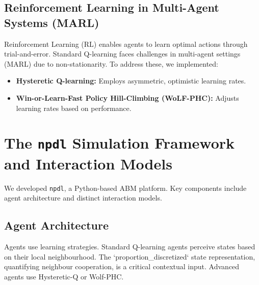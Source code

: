 \documentclass[]{llncs} %
\begin{document}
\subsection{Reinforcement Learning in Multi-Agent Systems (MARL)}
Reinforcement Learning (RL) enables agents to learn optimal actions through trial-and-error. %
Standard Q-learning faces challenges in multi-agent settings (MARL) due to non-stationarity. %
To address these, we implemented:
\begin{itemize}
    \item \textbf{Hysteretic Q-learning:} Employs asymmetric, optimistic learning rates. %
    \item \textbf{Win-or-Learn-Fast Policy Hill-Climbing (WoLF-PHC):} Adjusts learning rates based on performance. %
\end{itemize}

\section{The \texttt{npdl} Simulation Framework and Interaction Models}
\label{sec:framework}
We developed \texttt{npdl}, a Python-based ABM platform. Key components include agent architecture and distinct interaction models.

\subsection{Agent Architecture}
Agents use learning strategies. Standard Q-learning agents perceive states based on their local neighbourhood. The `proportion_discretized` state representation, quantifying neighbour cooperation, is a critical contextual input. Advanced agents use Hysteretic-Q or Wolf-PHC.
\end{document}
